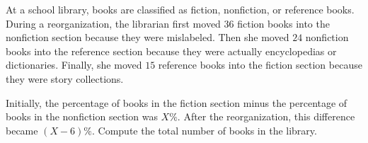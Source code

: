 At a school library, books are classified as fiction, nonfiction, or reference books. During a reorganization, the librarian first moved \(36\) fiction books into the nonfiction section because they were mislabeled. Then she moved \(24\) nonfiction books into the reference section because they were actually encyclopedias or dictionaries. Finally, she moved \(15\) reference books into the fiction section because they were story collections.

Initially, the percentage of books in the fiction section minus the percentage of books in the nonfiction section was \(X\%\). After the reorganization, this difference became \((X-6)\%\). Compute the total number of books in the library.
